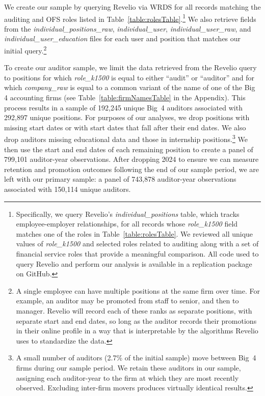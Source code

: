 \documentclass[11pt]{article}
\begin{document}
        We create our sample by querying Revelio via WRDS for all records matching the auditing and OFS roles listed in Table~\ref{table:rolesTable}.\footnote{Specifically, we query Revelio's \textit{individual\_positions} table, which tracks employee-employer relationships, for all records whose \textit{role\_k1500} field matches one of the roles in Table~\ref{table:rolesTable}. We reviewed all unique values of \textit{role\_k1500} and selected roles related to auditing along with a set of financial service roles that provide a meaningful comparison. All code used to query Revelio and perform our analysis is available in a replication package on GitHub.} We also retrieve fields from the \textit{individual\_positions\_raw}, \textit{individual\_user}, \textit{individual\_user\_raw}, and \textit{individual\_user\_education} files for each user and position that matches our initial query.\footnote{A single employee can have multiple positions at the same firm over time. For example, an auditor may be promoted from staff to senior, and then to manager. Revelio will record each of these ranks as separate positions, with separate start and end dates, so long as the auditor records their promotions in their online profile in a way that is interpretable by the algorithms Revelio uses to standardize the data.}
        
        To create our auditor sample, we limit the data retrieved from the Revelio query to positions for which \textit{role\_k1500} is equal to either ``audit'' or ``auditor'' and for which \textit{company\_raw} is equal to a common variant of the name of one of the Big 4 accounting firms (see Table~\ref{table:firmNamesTable} in the Appendix). This process results in a sample of 192,245 unique Big~4 auditors associated with 292,897 unique positions. For purposes of our analyses, we drop positions with missing start dates or with start dates that fall after their end dates. We also drop auditors missing educational data and those in internship positions.\footnote{A small number of auditors (2.7\% of the initial sample) move between Big~4 firms during our sample period. We retain these auditors in our sample, assigning each auditor-year to the firm at which they are most recently observed. Excluding inter-firm movers produces virtually identical results.} We then use the start and end dates of each remaining position to create a panel of 799,101 auditor-year observations. After dropping 2024 to ensure we can measure retention and promotion outcomes following the end of our sample period, we are left with our primary sample: a panel of 743,878 auditor-year observations associated with 150,114 unique auditors.
        
\end{document}
